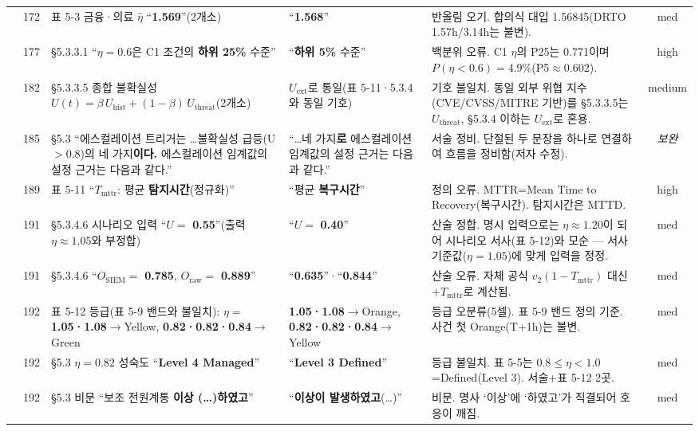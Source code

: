 \documentclass[11pt,a4paper]{article}
\newcommand{\err}[1]{{\color{errred}\textbf{#1}}}
\begin{document}
\begin{longtable}{@{}c c >{\RaggedRight}p{4.6cm} >{\RaggedRight}p{3.0cm} >{\RaggedRight}p{3.4cm} c@{}}
\addlinespace
47 & 172 & 표 5-3 금융·의료 $\hat\eta$ ``\err{1.569}''(2개소) & ``\err{1.568}'' & 반올림 오기. 합의식 대입 1.56845(DRTO 1.57h/3.14h는 불변). & med \\
\addlinespace
48 & 177 & \S5.3.3.1 ``$\eta{=}0.6$은 C1 조건의 \err{하위 25\%} 수준'' & ``\err{하위 5\%} 수준'' & 백분위 오류. C1 $\eta$의 P25는 0.771이며 $P(\eta{<}0.6){=}4.9\%$(P5$\approx$0.602). & high \\
\addlinespace
49 & 182 & \S5.3.3.5 종합 불확실성 $U(t)=\beta\,U_{\mathrm{hist}}+(1-\beta)\,$\err{$U_{\mathrm{threat}}$}(2개소) & \err{$U_{\mathrm{ext}}$}로 통일(표 5-11·5.3.4와 동일 기호) & 기호 불일치. 동일 외부 위협 지수(CVE/CVSS/MITRE 기반)를 \S5.3.3.5는 $U_{\mathrm{threat}}$, \S5.3.4 이하는 $U_{\mathrm{ext}}$로 혼용. & medium \\
\addlinespace
50 & 185 & \S5.3 ``에스컬레이션 트리거는 …불확실성 급등(U$>$0.8)의 네 가지\err{이다.} 에스컬레이션 임계값의 설정 근거는 다음과 같다.'' & ``…네 가지\err{로} 에스컬레이션 임계값의 설정 근거는 다음과 같다.'' & 서술 정비. 단절된 두 문장을 하나로 연결하여 흐름을 정비함(저자 수정). & \emph{보완} \\
\addlinespace
51 & 189 & 표 5-11 ``$T_{\text{mttr}}$: 평균 \err{탐지시간}(정규화)'' & ``평균 \err{복구시간}'' & 정의 오류. MTTR=Mean Time to Recovery(복구시간). 탐지시간은 MTTD. & high \\
\addlinespace
52 & 191 & \S5.3.4.6 시나리오 입력 ``$U=$ \err{0.55}''(출력 $\eta\approx1.05$와 부정합) & ``$U=$ \err{0.40}'' & 산술 정합. 명시 입력으로는 $\eta\approx1.20$이 되어 시나리오 서사(표 5-12)와 모순 — 서사 기준값($\eta{=}1.05$)에 맞게 입력을 정정. & med \\
\addlinespace
53 & 191 & \S5.3.4.6 ``$O_{\mathrm{SIEM}}=$ \err{0.785}, $O_{\mathrm{raw}}=$ \err{0.889}'' & ``\err{0.635}''·``\err{0.844}'' & 산술 오류. 자체 공식 $v_2(1-T_{\mathrm{mttr}})$ 대신 $+T_{\mathrm{mttr}}$로 계산됨. & med \\
\addlinespace
54 & 192 & 표 5-12 등급(표 5-9 밴드와 불일치): $\eta=$\err{1.05·1.08}$\to$Yellow, \err{0.82·0.82·0.84}$\to$Green & \err{1.05·1.08}$\to$Orange, \err{0.82·0.82·0.84}$\to$Yellow & 등급 오분류(5셀). 표 5-9 밴드 정의 기준. 사건 첫 Orange(T+1h)는 불변. & med \\
\addlinespace
55 & 192 & \S5.3 $\eta{=}0.82$ 성숙도 ``\err{Level 4 Managed}'' & ``\err{Level 3 Defined}'' & 등급 불일치. 표 5-5는 $0.8{\le}\eta{<}1.0$=Defined(Level 3). 서술+표 5-12 2곳. & med \\
\addlinespace
56 & 192 & \S5.3 비문 ``보조 전원계통 \err{이상 (…)하였고}'' & ``\err{이상이 발생하였고}(…)'' & 비문. 명사 `이상'에 `하였고'가 직결되어 호응이 깨짐. & med \\

\end{longtable}
\end{document}
